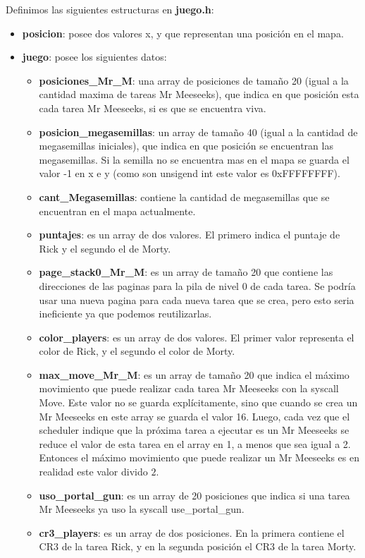 \documentclass[a4paper]{article}
\begin{document}
\justify
Definimos las siguientes estructuras en \textbf{juego.h}:
\begin{itemize}
	\item \textbf{posicion}: posee dos valores x, y que representan una posición en el mapa.
	\item \textbf{juego}: posee los siguientes datos:
	\begin{itemize}
		\item \textbf{posiciones_Mr_M}: una array de posiciones de tamaño 20 (igual a la cantidad maxima de tareas Mr Meeseeks), que indica en que posición esta cada tarea Mr Meeseeks, si es que se encuentra viva.
		\item \textbf{posicion_megasemillas}: un array de tamaño 40 (igual a la cantidad de megasemillas iniciales), que indica en que posición se encuentran las megasemillas. Si la semilla no se encuentra mas en el mapa se guarda el valor -1 en x e y (como son unsigend int este valor es 0xFFFFFFFF).
		\item \textbf{cant_Megasemillas}: contiene la cantidad de megasemillas que se encuentran en el mapa actualmente.
		\item \textbf{puntajes}: es un array de dos valores. El primero indica el puntaje de Rick y el segundo el de Morty.
		\item \textbf{page_stack0_Mr_M}: es un array de tamaño 20 que contiene las direcciones de las paginas para la pila de nivel 0 de cada tarea. Se podría usar una nueva pagina para cada nueva tarea que se crea, pero esto seria ineficiente ya que podemos reutilizarlas.
		\item \textbf{color_players}: es un array de dos valores. El primer valor representa el color de Rick, y el segundo el color de Morty.
		\item \textbf{max_move_Mr_M}: es un array de tamaño 20 que  indica el máximo movimiento que puede realizar cada tarea Mr Meeseeks con la syscall Move. Este valor no se guarda explícitamente, sino que cuando se crea un Mr Meeseeks en este array se guarda el valor 16. Luego, cada vez que el scheduler indique que la próxima tarea a ejecutar es un Mr Meeseeks se reduce el valor de esta tarea en el array en 1, a menos que sea igual a 2. Entonces el máximo movimiento que puede realizar un Mr Meeseeks es en realidad este valor divido $2$.
		\item \textbf{uso_portal_gun}: es un array de 20 posiciones que indica si una tarea Mr Meeseeks ya uso la syscall use_portal_gun.
		\item \textbf{cr3_players}: es un array de dos posiciones. En la primera contiene el CR3 de la tarea Rick, y en la segunda posición el CR3 de la tarea Morty.
	\end{itemize}
\end{itemize}
\end{document}
